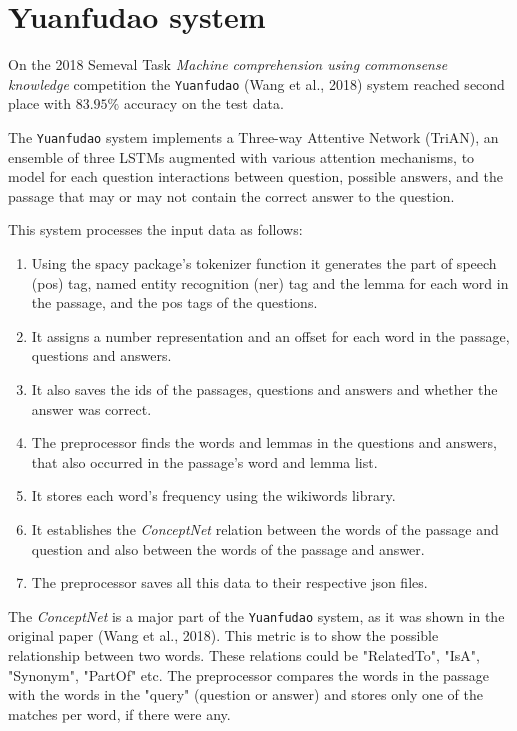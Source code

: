 \chapter*{Yuanfudao system}
On the 2018 Semeval Task \textit{Machine comprehension using commonsense knowledge} competition the \texttt{Yuanfudao} (Wang et al., 2018) system reached second place with $83.95\%$ accuracy on the test data.


The \texttt{Yuanfudao} system implements a Three-way Attentive Network (TriAN), an ensemble of three LSTMs augmented with various attention mechanisms, to model for each question interactions between question, possible answers, and the passage that may or may not contain the correct answer to the question.


This system processes the input data as follows:

\begin{enumerate}
	\item Using the spacy package's tokenizer function it generates the part of speech (pos) tag, named entity recognition (ner) tag and the lemma for each word in the passage, and the pos tags of the questions.
	\item It assigns a number representation and an offset for each word in the passage, questions and answers.
	\item It also saves the ids of the passages, questions and answers and whether the answer was correct.
	\item The preprocessor finds the words and lemmas in the questions and answers, that also occurred in the passage's word and lemma list. 
	\item It stores each word's frequency using the wikiwords library.
	\item It  establishes the \textit{ConceptNet} relation between the words of the passage and question and also between the words of the passage and answer.
	\item The preprocessor saves all this data to their respective json files.
\end{enumerate}


The \textit{ConceptNet} is a major part of the \texttt{Yuanfudao} system, as it was shown in the original paper (Wang et al., 2018). This metric is to show the possible relationship between two words. These relations could be "RelatedTo", "IsA", "Synonym", "PartOf" etc. The preprocessor compares the words in the passage with the words in the "query" (question or answer) and stores only one of the matches per word, if there were any.

